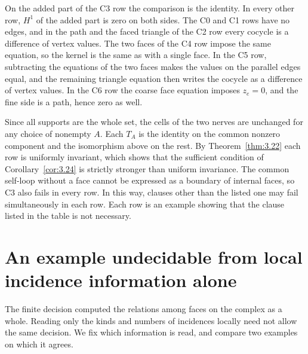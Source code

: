 \begin{example}
On the added part of the C3 row the comparison is the identity.
In every other row, $H^1$ of the added part is zero on both sides.
The C0 and C1 rows have no edges, and in the path and the faced triangle of the C2
row every cocycle is a difference of vertex values.
The two faces of the C4 row impose the same equation, so the kernel is the same as
with a single face.
In the C5 row, subtracting the equations of the two faces makes the values on the
parallel edges equal, and the remaining triangle equation then writes the cocycle as
a difference of vertex values.
In the C6 row the coarse face equation imposes $z_e=0$, and the fine side is a path,
hence zero as well.

Since all supports are the whole set, the cells of the two nerves are unchanged for any
choice of nonempty $A$.
Each $T_A$ is the identity on the common nonzero component and the isomorphism above
on the rest.
By Theorem~\ref{thm:3.22} each row is uniformly invariant, which shows that the
sufficient condition of Corollary~\ref{cor:3.24} is strictly stronger than uniform
invariance.
The common self-loop without a face cannot be expressed as a boundary of internal
faces, so C3 also fails in every row.
In this way, clauses other than the listed one may fail simultaneously in each row.
Each row is an example showing that the clause listed in the table is not necessary.

\end{example}

\section{An example undecidable from local incidence information alone}\label{sec:3.7}

The finite decision computed the relations among faces on the complex as a whole.
Reading only the kinds and numbers of incidences locally need not allow the same
decision.
We fix which information is read, and compare two examples on which it agrees.


